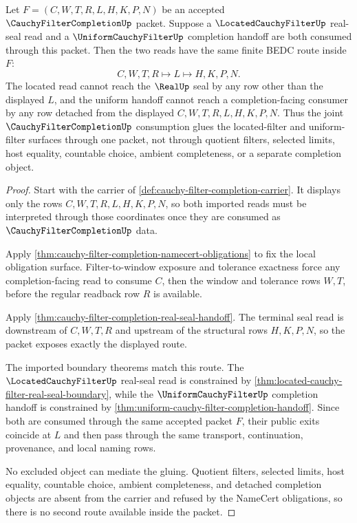 \begin{theorem}
\label{thm:cauchy-filter-completion-located-uniform-gluing}
Let $F=(C,W,T,R,L,H,K,P,N)$ be an accepted $\CauchyFilterCompletionUp$ packet. Suppose a $\LocatedCauchyFilterUp$ real-seal read and a $\UniformCauchyFilterUp$ completion handoff are both consumed through this packet. Then the two reads have the same finite BEDC route inside $F$:
$$
C,W,T,R \longmapsto L \longmapsto H,K,P,N .
$$
The located read cannot reach the $\RealUp$ seal by any row other than the displayed $L$, and the uniform handoff cannot reach a completion-facing consumer by any row detached from the displayed $C,W,T,R,L,H,K,P,N$. Thus the joint $\CauchyFilterCompletionUp$ consumption glues the located-filter and uniform-filter surfaces through one packet, not through quotient filters, selected limits, host equality, countable choice, ambient completeness, or a separate completion object.
\end{theorem}
\begin{proof}
Start with the carrier of \autoref{def:cauchy-filter-completion-carrier}. It displays only the rows $C,W,T,R,L,H,K,P,N$, so both imported reads must be interpreted through those coordinates once they are consumed as $\CauchyFilterCompletionUp$ data.

Apply \autoref{thm:cauchy-filter-completion-namecert-obligations} to fix the local obligation surface. Filter-to-window exposure and tolerance exactness force any completion-facing read to consume $C$, then the window and tolerance rows $W,T$, before the regular readback row $R$ is available.

Apply \autoref{thm:cauchy-filter-completion-real-seal-handoff}. The terminal seal read is downstream of $C,W,T,R$ and upstream of the structural rows $H,K,P,N$, so the packet exposes exactly the displayed route.

The imported boundary theorems match this route. The $\LocatedCauchyFilterUp$ real-seal read is constrained by \autoref{thm:located-cauchy-filter-real-seal-boundary}, while the $\UniformCauchyFilterUp$ completion handoff is constrained by \autoref{thm:uniform-cauchy-filter-completion-handoff}. Since both are consumed through the same accepted packet $F$, their public exits coincide at $L$ and then pass through the same transport, continuation, provenance, and local naming rows.

No excluded object can mediate the gluing. Quotient filters, selected limits, host equality, countable choice, ambient completeness, and detached completion objects are absent from the carrier and refused by the NameCert obligations, so there is no second route available inside the packet.
\end{proof}

